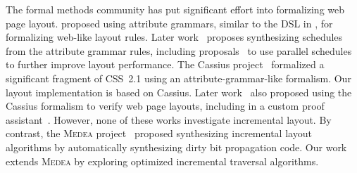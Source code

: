 The formal methods community has put significant effort
  into formalizing web page layout.
\citet{meyerovich-1} proposed using attribute grammars,
  similar to the DSL in ,
  for formalizing web-like layout rules.
Later work~\cite{yufeng-1} proposes
  synthesizing schedules from the attribute grammar rules,
  including proposals~\cite{meyerovich-2,meyerovich-3}
  to use parallel schedules to further improve layout performance.
The Cassius project~\cite{cassius-1}
  formalized a significant fragment of CSS~2.1
  using an attribute-grammar-like formalism.
Our layout implementation is based on Cassius.
Later work~\cite{cassius-2} also proposed
  using the Cassius formalism to verify web page layouts,
  including in a custom proof assistant~\cite{cassius-3}.
However, none of these works investigate incremental layout.
By contrast, the \textsc{Medea} project~\cite{yufeng-2}
  proposed synthesizing incremental layout algorithms
  by automatically synthesizing dirty bit propagation code.
Our work extends \textsc{Medea} by exploring
  optimized incremental traversal algorithms.

